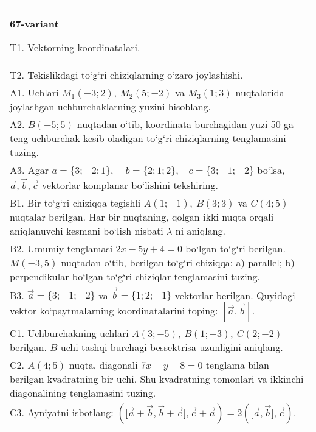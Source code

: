 \documentclass{article}
\begin{document}
\begin{tabular}{m{17cm}}
\textbf{67-variant}
\newline

T1. 
Vektorning koordinatalari.
 \\
T2. 
Tekislikdagi to‘g‘ri chiziqlarning o‘zaro joylashishi.
 \\
A1. 
Uchlari $M_1 (-3;2) $, $M_2 (5;-2) $ va $M_3 (1;3) $
nuqtalarida joylashgan uchburchaklarning yuzini hisoblang.
 \\
A2. 
$B (-5;5)$ nuqtadan o‘tib, koordinata burchagidan
yuzi 50 ga teng uchburchak kesib oladigan to‘g‘ri chiziqlarning tenglamasini
tuzing.
 \\
A3. 
Agar \(a = \{ 3; - 2;1\},\ \ \ \ \ b = \{ 2;1;2\},\ \ \ \ c = \{ 3; - 1; - 2\}\) bo‘lsa, $\overrightarrow{a}, \overrightarrow{b}, \overrightarrow{c}$ vektorlar komplanar bo‘lishini tekshiring.
 \\
B1. 
Bir to‘g‘ri chiziqqa tegishli \(A (1;-1),\ B (3;3) \) va
\(C (4;5) \) nuqtalar berilgan. Har bir nuqtaning, qolgan ikki nuqta orqali aniqlanuvchi kesmani bo‘lish nisbati $\lambda$ ni aniqlang.
 \\
B2. 
Umumiy tenglamasi \(2x-5y+4=0\) bo‘lgan to‘g‘ri
berilgan. \(M (-3,5) \) nuqtadan o‘tib, berilgan to‘g‘ri chiziqqa: a) parallel;
b) perpendikular bo‘lgan to‘g‘ri chiziqlar tenglamasini tuzing.
 \\
B3. 
$\vec{a} = \{ 3; - 1; - 2\}$ va $\vec{b} = \{ 1;2; - 1\}$ vektorlar berilgan. Quyidagi vektor ko‘paytmalarning koordinatalarini toping:
$\left\lbrack \vec{a},\vec{b} \right\rbrack$.
 \\
C1. 
Uchburchakning uchlari
\(A (3; - 5),\ B (1; - 3),\ C (2; - 2) \) berilgan. $B$ uchi tashqi
burchagi bessektrisa uzunligini aniqlang.
 \\
C2. 
\(A (4;5) \) nuqta, diagonali \(7x - y - 8 = 0\) tenglama
bilan berilgan kvadratning bir uchi. Shu kvadratning tomonlari va
ikkinchi diagonalining tenglamasini tuzing.
 \\
C3. 
Ayniyatni isbotlang: \((\lbrack\vec{a} + \vec{b},\vec{b} + \vec{c}\rbrack,\vec{c} + \vec{a}) = 2 (\lbrack\vec{a},\vec{b}\rbrack,\vec{c}) \).
 \\

\end{tabular}
\vspace{1cm}
\end{document}
